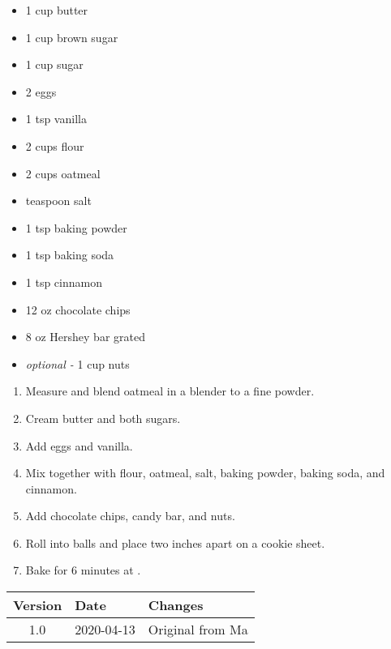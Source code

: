 
\ingredients
\begin{multicols}{2}
\raggedcolumns %
\begin{itemize}
    \item 1 cup butter
    \item 1 cup brown sugar
    \item 1 cup sugar
    \item 2 eggs
    \item 1 tsp vanilla
    \item 2 cups flour
    \item 2  cups oatmeal
    \item {} teaspoon salt
    \item 1 tsp baking powder
    \item 1 tsp baking soda
    \item 1 tsp cinnamon
    \item 12 oz chocolate chips
    \item 8 oz Hershey bar grated
    \item \textit{optional - }1  cup nuts

\end{itemize}
\end{multicols}

\instructions
\begin{enumerate}
    \item Measure and blend oatmeal in a blender to a fine powder. 
    \item Cream butter and both sugars.
    \item Add eggs and vanilla.
    \item Mix together with flour, oatmeal, salt, baking powder, baking soda, and cinnamon. 
    \item Add chocolate chips, candy bar, and nuts.
    \item Roll into balls and place two inches apart on a cookie sheet.
    \item Bake for 6 minutes at .
\end{enumerate}

\vfill

\begin{tabular}{ c | l | l }
  \textbf{Version} & \textbf{Date} & \textbf{Changes} \\ 
  \hline		
  1.0 & 2020-04-13 & Original from Ma \\
\end{tabular}



